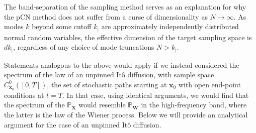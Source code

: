The band-separation of the sampling method serves as an explanation for why the pCN method does not suffer from a curse of dimensionality as $N \to \infty$. As modes $k$ beyond some cutoff $k_|$ are approximately independently distributed normal random variables, the effective dimension of the target sampling space is $d k_|$, regardless of any choice of mode truncations $N > k_|$.

Statements analogous to the above would apply if we instead considered the spectrum of the law of an unpinned It\^{o} diffusion, with sample space $C_{\mathbf{x}_0}^0([0,T])$, the set of stochastic paths starting at $\mathbf{x}_0$ with open end-point conditions at $t=T$. In that case, using identical arguments, we would find that the spectrum of the $\mathbb{P}_\mathbf{X}$ would resemble $\mathbb{P}_\mathbf{W}$ in the high-frequency band, where the latter is the law of the Wiener process. Below we will provide an analytical argument for the case of an unpinned It\^{o} diffusion.

